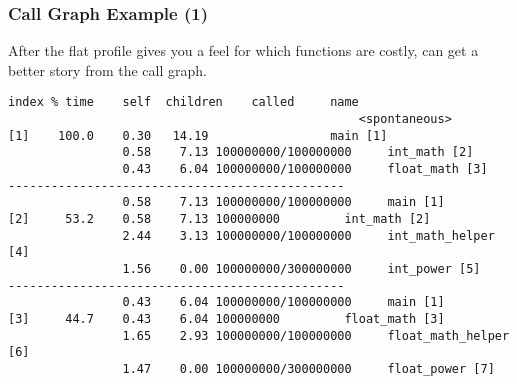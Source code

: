 \begin{frame}[fragile]
  \frametitle{Call Graph Example (1)}

\large
\begin{changemargin}{1.5cm}
  
    After the flat profile gives you a feel for which functions are costly, 
      can get a better story from the call graph.
  \vfill
  \begin{lstlisting}[basicstyle=\tiny]
index % time    self  children    called     name
                                                 <spontaneous>
[1]    100.0    0.30   14.19                 main [1]
                0.58    7.13 100000000/100000000     int_math [2]
                0.43    6.04 100000000/100000000     float_math [3]
-----------------------------------------------
                0.58    7.13 100000000/100000000     main [1]
[2]     53.2    0.58    7.13 100000000         int_math [2]
                2.44    3.13 100000000/100000000     int_math_helper [4]
                1.56    0.00 100000000/300000000     int_power [5]
-----------------------------------------------
                0.43    6.04 100000000/100000000     main [1]
[3]     44.7    0.43    6.04 100000000         float_math [3]
                1.65    2.93 100000000/100000000     float_math_helper [6]
                1.47    0.00 100000000/300000000     float_power [7]
  \end{lstlisting}
  \end{changemargin}
\end{frame}

